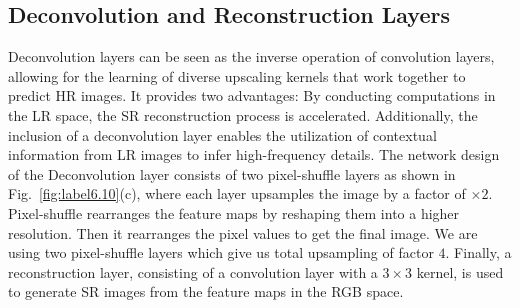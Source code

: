 \documentclass[conference]{IEEEtran}
\begin{document}
\subsection{Deconvolution and Reconstruction Layers}
Deconvolution layers can be seen as the inverse operation of convolution layers, allowing for the learning of diverse upscaling kernels that work together to predict HR images. It provides two advantages: By conducting computations in the LR space, the SR reconstruction process is accelerated. %
Additionally, the inclusion of a deconvolution layer enables the utilization of contextual information from LR images to infer high-frequency details.
The network design of the Deconvolution layer consists of two pixel-shuffle layers as shown in Fig.~\ref{fig:label6.10}(c), where each layer upsamples the image by a factor of $\times2$. Pixel-shuffle rearranges the feature maps by reshaping them into a higher resolution. Then it rearranges the pixel values to get the final image. We are using two pixel-shuffle layers which give us total  upsampling of factor $4$. 
Finally, a reconstruction layer, consisting of a convolution layer with a $3\times3$ kernel, is used to generate SR images from the feature maps in the RGB space.
\end{document}
